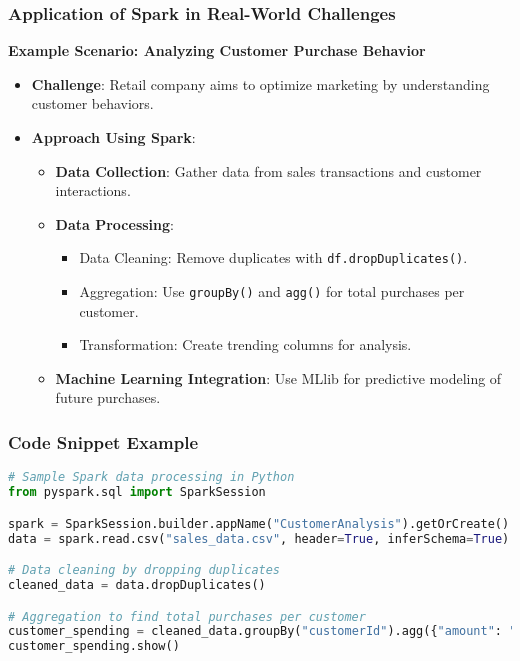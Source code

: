 \documentclass[aspectratio=169]{beamer}
\begin{document}
\begin{frame}
    \frametitle{Application of Spark in Real-World Challenges}
    \textbf{Example Scenario: Analyzing Customer Purchase Behavior}
    \begin{itemize}
        \item \textbf{Challenge}: Retail company aims to optimize marketing by understanding customer behaviors.
        \item \textbf{Approach Using Spark}:
            \begin{itemize}
                \item \textbf{Data Collection}: Gather data from sales transactions and customer interactions.
                \item \textbf{Data Processing}:
                    \begin{itemize}
                        \item Data Cleaning: Remove duplicates with \texttt{df.dropDuplicates()}.
                        \item Aggregation: Use \texttt{groupBy()} and \texttt{agg()} for total purchases per customer.
                        \item Transformation: Create trending columns for analysis.
                    \end{itemize}
                \item \textbf{Machine Learning Integration}: Use MLlib for predictive modeling of future purchases.
            \end{itemize}
    \end{itemize}
\end{frame}

\begin{frame}[fragile]
    \frametitle{Code Snippet Example}
    \begin{lstlisting}[language=Python]
# Sample Spark data processing in Python
from pyspark.sql import SparkSession

spark = SparkSession.builder.appName("CustomerAnalysis").getOrCreate()
data = spark.read.csv("sales_data.csv", header=True, inferSchema=True)

# Data cleaning by dropping duplicates
cleaned_data = data.dropDuplicates()

# Aggregation to find total purchases per customer
customer_spending = cleaned_data.groupBy("customerId").agg({"amount": "sum"})
customer_spending.show()
    \end{lstlisting}
\end{frame}
\end{document}
